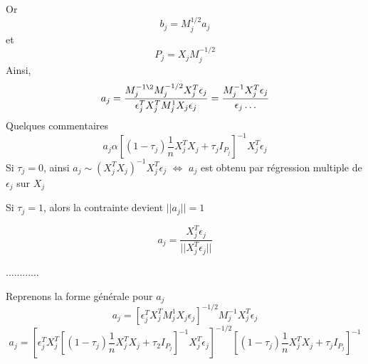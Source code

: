 \documentclass{article}
\begin{document}
Or
\begin{equation}
b_j=M_j^{1/2}a_j
\end{equation}
et
\begin{equation}
P_j=X_jM_j^{-1/2}
\end{equation}
Ainsi,
\begin{equation}
a_j=\frac{M_j^{-1\2}M_j^{-1/2}X_j^T\epsilon_j}{\epsilon_j^TX_j^TM_j^1X_j\epsilon_j}=\frac{M_j^{-1}X_j^T\epsilon_j}{\epsilon_j\ldots}
\end{equation}
Quelques commentaires
\begin{equation}
a_j\alpha [(1-\tau_j)\frac{1}{n}X^T_jX_j+\tau_jI_{P_j}]^{-1}X_j^T\epsilon_j
\end{equation}
Si $\tau_j=0$, ainsi $a_j\sim (X_j^TX_j)^{-1}X_j^T\epsilon_j$
$\Leftrightarrow$ $a_j$ est obtenu par r\'egression multiple de $\epsilon_j$ sur $X_j$

Si $\tau_j=1$, alors la contrainte devient  $||a_j||=1$

\begin{equation}
a_j=\frac{X_j^T\epsilon_j}{||X_j^T\epsilon_j||}
\end{equation}

............

Reprenons la forme g\'en\'erale pour $a_j$
\begin{equation}
a_j=[\epsilon_j^TX_j^TM_j^1X_j\epsilon_j]^{-1/2}M_j^{-1}X_j^T\epsilon_j
\end{equation}
\begin{equation}
a_j=[\epsilon_j^TX_j^T[(1-\tau_j)\frac{1}{n}X_j^TX_j+\tau_2 I_{P_j}]^{-1}X_j^T\epsilon_j]^{-1/2}[(1-\tau_j)\frac{1}{n}X_j^TX_j+\tau_j I_{P_j}]^{-1}
\end{equation}
\end{document}
